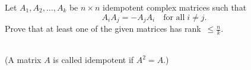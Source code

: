 \documentclass{article}
\begin{document}
\setlength{\parindent}{0pt}
Let $A_1, A_2, \dots , A_k$ be $n \times n$ idempotent complex matrices such that \[A_iA_j = -A_jA_i\quad\text{for all}\; i \not= j.\]
Prove that at least one of the given matrices has rank~$\leq \frac{n}{k}$.

\;\\
(A matrix $A$ is called idempotent if $A^2 = A$.)
\end{document}
